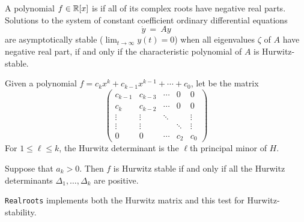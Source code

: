 A polynomial $f\in\mathbb{R}[x]$ is  if all of its complex roots have negative real parts.
Solutions to the system of constant coefficient ordinary differential equations 
%
 \[
  \dot{y}\ =\ Ay
 \]
%
are asymptotically stable ($\lim_{t\to\infty}y(t)=0$) when all eigenvalues $\zeta$ of $A$ have negative real part,
if and only if the characteristic polynomial of $A$ is Hurwitz-stable.
 
Given a polynomial $f=c_kx^k+c_{k-1}x^{k-1}+\dotsb+c_0$,  let  be the matrix
\[
\left(\begin{matrix}
  c_{k-1} & c_{k-3} & \dotsb & 0  & 0 \\
  c_k    & c_{k-2} &  \dotsb& 0 & 0 \\
  \vdots & \vdots & \ddots&    &\vdots\\
  \vdots & \vdots & & \ddots&\vdots\\
    0    &    0   & \dotsb&c_2 & c_0
\end{matrix}\right)
\]
For $1\leq \ell\leq k$, the Hurwitz determinant  is the $\ell$th principal minor of $H$.


\begin{theorem}
  Suppose that $a_k>0$.
  Then $f$ is Hurwitz stable if and only if all the Hurwitz determinants $\Delta_{1},\dots,\Delta_{k}$ are positive.
\end{theorem}

{\tt Realroots} implements both the Hurwitz matrix and this test for Hurwitz-stability.
%
\begin{leftbar}

\end{leftbar}
%
